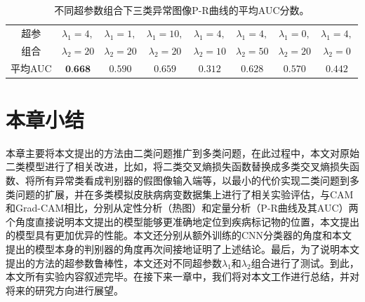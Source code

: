 \begin{table}[H]
	\centering
	\caption[不同超参数组合下三类异常图像P-R曲线的平均AUC分数]{不同超参数组合下三类异常图像P-R曲线的平均AUC分数。}
	\label{tab:simulated_skin_diff_parameters}
		\begin{tabular}{c|c|c|c|c|c|c|c}
			\toprule[2pt]
			
			超参& $\lambda_{1}=4,$ & $\lambda_{1}=1,$& $\lambda_{1}=10,$&
			$\lambda_{1}=4,$ & $\lambda_{1}=4,$ &
			$\lambda_{1}=0,$ &
			$\lambda_{1}=4,$\\
			组合		  & 
			$\lambda_{2}=20$ & $\lambda_{2}=20$ &
			$\lambda_{2}=20$ & $\lambda_{2}=10$ & $\lambda_{2}=50$ &
			$\lambda_{2}=20$&
			$\lambda_{2}=0$ \\
			\midrule[2pt]



			平均AUC	& $\textbf{0.668}$ &	$0.590 $ & $0.659$ & $0.312$ & $0.628$& $0.570$ &	$0.442$ \\
			\bottomrule[2pt]
		\end{tabular}
\end{table}
\section{本章小结}
本章主要将本文提出的方法由二类问题推广到多类问题，在此过程中，本文对原始二类模型进行了相关改进，比如，将二类交叉熵损失函数替换成多类交叉熵损失函数、将所有异常类看成判别器的假图像输入端等，以最小的代价实现二类问题到多类问题的扩展，并在多类模拟皮肤病病变数据集上进行了相关实验评估，与CAM和Grad-CAM相比，分别从定性分析（热图）和定量分析（P-R曲线及其AUC）两个角度直接说明本文提出的模型能够更准确地定位到疾病标记物的位置，本文提出的模型具有更加优异的性能。本文还分别从额外训练的CNN分类器的角度和本文提出的模型本身的判别器的角度再次间接地证明了上述结论。最后，为了说明本文提出的方法的超参数鲁棒性，本文还对不同超参数$\lambda_{1}$和$\lambda_{2}$组合进行了测试。到此，本文所有实验内容叙述完毕。在接下来一章中，我们将对本文工作进行总结，并对将来的研究方向进行展望。

